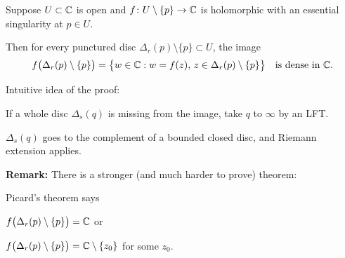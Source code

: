 \documentclass[10pt,aspectratio=169]{beamer}
\begin{document}
\begin{frame}
\begin{theorem}
Suppose $U \subset {\mathbb{C}}$ is open and $f \colon U \setminus \{ p \} \to {\mathbb{C}}$ is
holomorphic with
an essential singularity at $p \in U$.
\pause

Then for every punctured disc
$\Delta_r(p) \setminus \{ p \} \subset U$, the image
\begin{equation*}
f\bigl(\Delta_r(p) \setminus \{ p \} \bigr)
=
\bigl\{ w \in {\mathbb{C}} : w = f(z), \, z \in \Delta_r(p) \setminus \{ p \} \bigr\}
\quad \text{is dense in } {\mathbb{C}}.
\end{equation*}
\end{theorem}

\pause

Intuitive idea of the proof:

If a whole disc $\Delta_s(q)$ is missing from the image,
take $q$ to $\infty$ by an LFT.

\medskip
\pause

$\Delta_s(q)$ goes to the complement of a bounded closed disc,
and Riemann extension applies.

\pause
\medskip

\textbf{Remark:}
There is a stronger (and much harder to prove) theorem:

\pause
\medskip

Picard's theorem says

$f\bigl(\Delta_r(p) \setminus \{ p \} \bigr) = {\mathbb{C}}$ or 

$f\bigl(\Delta_r(p) \setminus \{ p \} \bigr) = {\mathbb{C}} \setminus \{ z_0 \}$ for
some $z_0$.

\end{frame}
\end{document}
